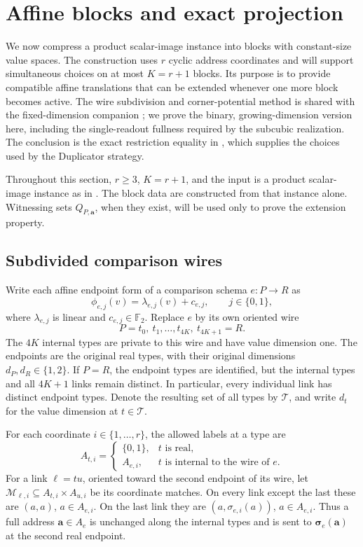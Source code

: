 \documentclass[11pt]{article}
\theoremstyle{definition}
\begin{document}
\section{Affine blocks and exact projection}
\label{offset:section}

We now compress a product scalar-image instance into blocks with
constant-size value spaces. The construction uses \(r\) cyclic address
coordinates and will support simultaneous choices on at most
\(K=r+1\) blocks. Its purpose is to provide compatible affine translations
that can be extended whenever one more block becomes active. The wire subdivision and corner-potential method is shared with
the fixed-dimension companion \citep[Section~3]{CompanionFixedDimension};
we prove the binary, growing-dimension version here, including the
single-readout fullness required by the subcubic realization. The conclusion is the exact restriction equality in
, which supplies the choices used by the
Duplicator strategy.

Throughout this section, \(r\geq 3\), \(K=r+1\), and the input is a product
scalar-image instance as in . The block data are
constructed from that instance alone. Witnessing sets \(Q_{P,\mathbf a}\),
when they exist, will be used only to prove the extension property.

\subsection{Subdivided comparison wires}
\label{offset:subdivision}

Write each affine endpoint form of a comparison schema \(e:P\to R\) as
\[
  \phi_{e,j}(v)=\lambda_{e,j}(v)+c_{e,j},
  \qquad j\in\{0,1\},
\]
where \(\lambda_{e,j}\) is linear and \(c_{e,j}\in\mathbb F_2\).
Replace \(e\) by its own oriented wire
\[
  P=t_0,\ t_1,\ldots,t_{4K},\ t_{4K+1}=R.
\]
The \(4K\) internal types are private to this wire and have value dimension
one. The endpoints are the original real types, with their original
dimensions \(d_P,d_R\in\{1,2\}\). If \(P=R\), the endpoint types are
identified, but the internal types and all \(4K+1\) links remain distinct.
In particular, every individual link has distinct endpoint types. Denote
the resulting set of all types by \(\mathcal T\), and write \(d_t\) for
the value dimension at \(t\in\mathcal T\).

For each coordinate \(i\in\{1,\ldots,r\}\), the allowed labels at a type
are
\[
 A_{t,i}=
 \begin{cases}
   \{0,1\}, & t\text{ is real},\\
   A_{e,i}, & t\text{ is internal to the wire of }e.
 \end{cases}
\]
For a link \(\ell=tu\), oriented toward the second endpoint of its wire,
let \(\mathcal M_{\ell,i}\subseteq A_{t,i}\times A_{u,i}\) be its coordinate
matches. On every link except the last these are
\((a,a)\), \(a\in A_{e,i}\). On the last link they are
\((a,\sigma_{e,i}(a))\), \(a\in A_{e,i}\).
Thus a full address \(\mathbf a\in A_e\) is unchanged along the internal
types and is sent to \(\boldsymbol\sigma_e(\mathbf a)\) at the second real
endpoint.
\end{document}
